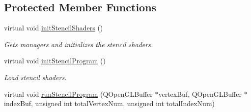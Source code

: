 \subsection*{Protected Member Functions}
\begin{DoxyCompactItemize}
\item 
\mbox{\label{class_geometry_engine_1_1_geometry_world_item_1_1_geometry_light_1_1_stencil_test_light_a15f8732a28984856a59ab5d416920897}} 
virtual void \mbox{\hyperlink{class_geometry_engine_1_1_geometry_world_item_1_1_geometry_light_1_1_stencil_test_light_a15f8732a28984856a59ab5d416920897}{init\+Stencil\+Shaders}} ()
\begin{DoxyCompactList}\small\item\em Gets managers and initializes the stencil shaders. \end{DoxyCompactList}\item 
\mbox{\label{class_geometry_engine_1_1_geometry_world_item_1_1_geometry_light_1_1_stencil_test_light_abf2cc5f924b94fd20dcfc36d4edad495}} 
virtual void \mbox{\hyperlink{class_geometry_engine_1_1_geometry_world_item_1_1_geometry_light_1_1_stencil_test_light_abf2cc5f924b94fd20dcfc36d4edad495}{init\+Stencil\+Program}} ()
\begin{DoxyCompactList}\small\item\em Load stencil shaders. \end{DoxyCompactList}\item 
virtual void \mbox{\hyperlink{class_geometry_engine_1_1_geometry_world_item_1_1_geometry_light_1_1_stencil_test_light_a619546f72b149132ea11a28796d307ff}{run\+Stencil\+Program}} (Q\+Open\+G\+L\+Buffer $\ast$vertex\+Buf, Q\+Open\+G\+L\+Buffer $\ast$index\+Buf, unsigned int total\+Vertex\+Num, unsigned int total\+Index\+Num)
\end{DoxyCompactItemize}
